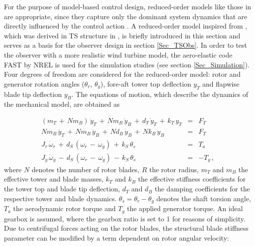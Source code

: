 \documentclass[a4paper]{article}
\newcommand{\yP}{\dot{y}}
\newcommand{\yPP}{\ddot{y}}
\newcommand{\omP}{\dot{\omega}}
\begin{document}
For the purpose of model-based control design, reduced-order models like those in \cite{Bindner:1999, Bianchi:2007} are appropriate, since they capture only the dominant system dynamics that are directly influenced by the control action \cite{Bianchi:2007}. A reduced-order model inspired from \cite{Bianchi:2007}, which was derived in TS structure in \cite{Georg:Fuzz2012}, is briefly introduced in this section and serves as a basis for the observer design in section \ref{Sec_TSObs}. In order to test the observer with a more realistic wind turbine model, the aero-elastic code FAST by NREL \cite{FASTUserGuide} is used for the simulation studies (see section \ref{Sec_Simulation}).
\newline Four degrees of freedom are considered for the reduced-order model: rotor and generator rotation angles ($\theta_r$, $\theta_g$), fore-aft tower top deflection $y_T$ and flapwise blade tip deflection $y_B$. The equations of motion, which describe the dynamics of the mechanical model, are obtained as



\begin{eqnarray}
	\left(m_T \, +\, N m_B\right) \, \yPP_T \, + \, N m_B \, \yPP_B \, + \, d_T \, \yP_T \, + \, k_T \, y_T  	& = & F_T	\label{Eq_EOM_Mech1} \\
	N m_B \, \yPP_T \, + \, N m_B \, \yPP_B \, + \, N d_B \, \yP_B \, + \, N k_B \, y_B 						& = & F_T	\label{Eq_EOM_Mech2} \\
	J_r \,\omP_r \, + \, d_S \, \left(\omega_r \, -\, \omega_g\right) \, + \, k_S \, \theta_s 					& = & T_a	\label{Eq_EOM_Mech3} \\
	J_g \,\omP_g \, - \, d_S \, \left(\omega_r \, -\, \omega_g\right) \, - \, k_S \, \theta_s 					& = & -T_g	\label{Eq_EOM_Mech4} \, ,
\end{eqnarray}
\newline where $N$ denotes the number of rotor blades, $R$ the rotor radius, $m_T$ and $m_B$ the effective tower and blade masses, $k_T$ and $k_B$ the effective stiffness coefficients for the tower top and blade tip deflection, $d_T$ and $d_B$ the damping coefficients for the respective tower and blade dynamics. $\theta_s = \theta_r - \theta_g$ denotes the shaft torsion angle, $T_a$ the aerodynamic rotor torque and $T_g$ the applied generator torque. An ideal gearbox is assumed, where the gearbox ratio is set to 1 for reasons of simplicity.
\newline Due to centrifugal forces acting on the rotor blades, the structural blade stiffness parameter can be modified by a term dependent on rotor angular velocity:
\end{document}
